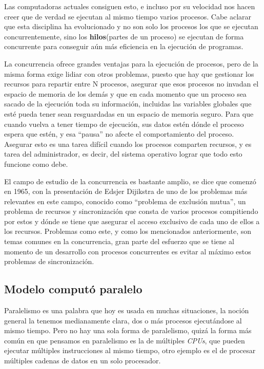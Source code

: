 \documentclass[letterpaper,12pt,oneside]{book}
\begin{document}
        Las computadoras actuales consiguen esto, e incluso
		por su velocidad nos hacen creer que de verdad se ejecutan al mismo tiempo varios procesos. Cabe aclarar que esta disciplina ha evolucionado
		y no son solo los procesos los que se ejecutan concurrentemente, sino los \textbf{hilos}(partes de un proceso) se ejecutan de forma
		concurrente para conseguir aún más eficiencia en la ejecución de programas\cite{tanenbaum_modern_2002}.
		
		La concurrencia ofrece grandes ventajas para la ejecución de procesos, pero de la misma forma exige lidiar con otros problemas, puesto
		que hay que gestionar los recursos para repartir entre N procesos, asegurar que esos procesos no invadan el espacio de memoria
		de los demás y que en cada momento que un proceso sea sacado de la ejecución toda su información, incluidas las variables globales
		que esté pueda tener sean resguardadas en un espacio de memoria seguro. Para que cuando vuelva a tener tiempo de ejecución,
		sus datos estén dónde el proceso espera que estén, y esa ``pausa'' no afecte el comportamiento del proceso. Asegurar esto es una
		tarea difícil cuando los procesos comparten recursos, y es tarea del administrador, es decir, del sistema operativo
		lograr que todo esto funcione como debe\cite{leslie_lamport_computer_2015}.
		
		El campo de estudio de la concurrencia es bastante amplio, se dice que comenzó en 1965, con la presentación de Edsjer Dijikstra de uno
		de los problemas más relevantes en este campo, conocido como ``problema de exclusión mutua'', un 
		problema de recursos y sincronización que consta de varios procesos compitiendo por estos y dónde se tiene que asegurar el acceso exclusivo de
		cada uno
		de ellos a los recursos\cite{gadi_taubenfeld_concurrent_nodate}.  Problemas como este, y como los mencionados anteriormente,
		son temas comunes en la concurrencia, gran parte del esfuerzo que se tiene al momento de un desarrollo con procesos
		concurrentes es evitar al máximo estos problemas de sincronización.
		

		
		
		

		\subsection{Modelo computó paralelo}
		
		Paralelismo es una palabra que hoy es usada en muchas situaciones, la noción general la tenemos medianamente clara, dos o más procesos
		ejecutándose al mismo tiempo. Pero no hay una sola forma de paralelismo, quizá la forma más común en que pensamos en paralelismo
		es la de múltiples \textit{CPUs}, que pueden ejecutar múltiples instrucciones al mismo tiempo, otro ejemplo es el de procesar
		múltiples cadenas de datos en un solo procesador\cite{null_essentials_2003}.
  
\end{document}
